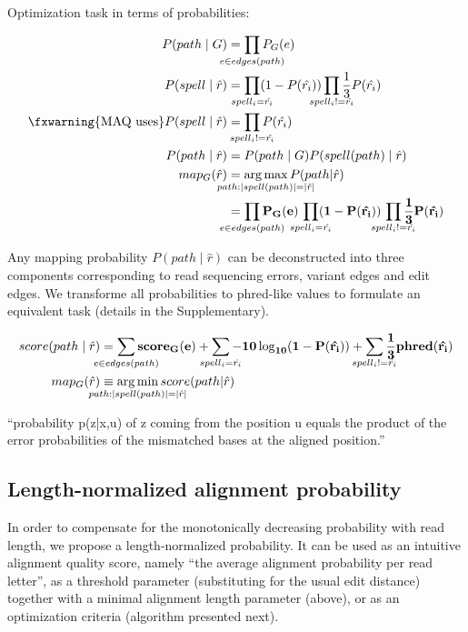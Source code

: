 Optimization task in terms of probabilities:

\begin{align*}
    P(path \mid G) &= \smashoperator{\prod_{e \in edges(path)}} P_G(e) \\
	P(spell \mid \hat{r}) &= \smashoperator{\prod_{spell_i = \hat{r_i}}} (1 - P(\hat{r_i})) \smashoperator{\prod_{\substack{spell_i != \hat{r_i}}}} \frac{1}{3} P(\hat{r_i}) \\
	\text{\fxwarning{MAQ uses}} P(spell \mid \hat{r}) &= \smashoperator{\prod_{\substack{spell_i != \hat{r_i}}}} P(\hat{r_i}) \\
    P(path \mid \hat{r}) &= P(path \mid G) P(spell(path) \mid \hat{r}) \\
	map_G(\hat{r}) &= \smashoperator{\argmax_{path: \lvert spell(path) \rvert = \lvert \hat{r} \rvert}} P(path | \hat{r}) \\
		&= \bf{ \smashoperator{\prod_{e \in edges(path)}} P_G(e) \, \smashoperator{\prod_{spell_i = \hat{r_i}}} (1 - P(\hat{r_i})) \, \smashoperator{\prod_{\substack{spell_i != \hat{r_i}}}} \frac{1}{3} P(\hat{r_i}) } \\
\end{align*}

Any mapping probability $P(path \mid \hat{r})$ can be deconstructed into three components corresponding to read sequencing errors, variant edges and edit edges.
We transforme all probabilities to phred-like values to formulate an equivalent task (details in the Supplementary). 

\begin{align*}
	score(path \mid \hat{r})
		&= \bf{\smashoperator{\sum_{e \in edges(path)}} score_G(e)
			+ \smashoperator{\sum_{spell_i=\hat{r_i}}} - 10 \log_{10} (1-P(\hat{r_i}))
			+ \smashoperator{\sum_{\substack{spell_i!=\hat{r_i}}}} \frac{1}{3} phred(\hat{r_i}) } \\
	map_G(\hat{r}) &\equiv \smashoperator{\argmin_{path: \lvert spell(path) \rvert = \lvert \hat{r} \rvert}} score(path | \hat{r}) \\
\end{align*}

``probability p(z|x,u) of z coming from the position u equals the product of the error probabilities of the mismatched bases at the aligned position.'' 


\subsection{Length-normalized alignment probability} 
In order to compensate for the monotonically decreasing probability with read length, we propose a length-normalized probability.
It can be used as an intuitive alignment quality score, namely ``the average alignment probability per read letter'',
	as a threshold parameter (substituting for the usual edit distance) together with a minimal alignment length parameter (above),
	or as an optimization criteria (algorithm presented next).

